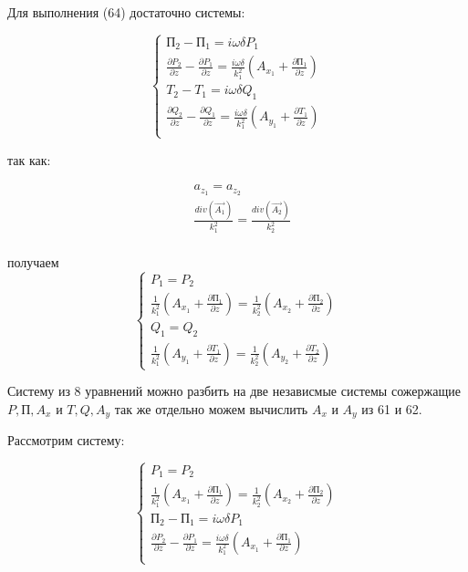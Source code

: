 	Для выполнения (64) достаточно системы:
	
	\begin{equation}
		\begin{cases}
			\text{П}_2 - \text{П}_1 = i \omega \delta P_1 \\
			\frac{\partial P_2}{\partial z} - \frac{\partial P_1}{\partial z} = \frac{i \omega \delta}{k_1^2} (A_{x_1} + \frac{\partial \text{П}_1}{\partial z}) \\
			T_2 - T_1 = i \omega \delta Q_1 \\
			\frac{\partial Q_2}{\partial z} - \frac{\partial Q_1}{\partial z} = \frac{i \omega \delta}{k_1^2} (A_{y_1} + \frac{\partial T_1}{\partial z}) \\
 		\end{cases}
	\end{equation}
	
	\newpage
	
	так как:
	
	\begin{equation*}
		\begin{aligned}
			&a_{z_1} = a_{z_2} \\ 
			&\frac{div(\vec{A_1})}{k_1^2} = \frac{div(\vec{A_2})}{k_2^2} \\
		\end{aligned}
	\end{equation*}
	
	получаем 
	\begin{equation*}
		\tag{65.1}
		\begin{cases}
			P_1 = P_2 \\
			\frac{1}{k_1^2}(A_{x_1} + \frac{\partial \text{П}_1}{\partial z}) = \frac{1}{k_2^2}(A_{x_2} + \frac{\partial \text{П}_2}{\partial z}) \\
			Q_1 = Q_2 \\
			\frac{1}{k_1^2}(A_{y_1} + \frac{\partial T_1}{\partial z}) = \frac{1}{k_2^2}(A_{y_2} + \frac{\partial T_2}{\partial z})
		\end{cases}
	\end{equation*}
	
	Систему из 8 уравнений можно разбить на две независмые системы сожержащие $P, \text{П}, A_x$ и $T, Q, A_y$
	так же отдельно можем вычислить $A_x$ и $A_y$ из 61 и 62.
	
	Рассмотрим систему:
	
	\begin{equation}
		\begin{cases}
			P_1 = P_2 \\
			\frac{1}{k_1^2}(A_{x_1} + \frac{\partial \text{П}_1}{\partial z}) = \frac{1}{k_2^2}(A_{x_2} + \frac{\partial \text{П}_2}{\partial z}) \\
			\text{П}_2 - \text{П}_1 = i \omega \delta P_1 \\
			\frac{\partial P_2}{\partial z} - \frac{\partial P_1}{\partial z} = \frac{i \omega \delta}{k_1^2} (A_{x_1} + \frac{\partial \text{П}_1}{\partial z}) \\
		\end{cases}
	\end{equation}
	
